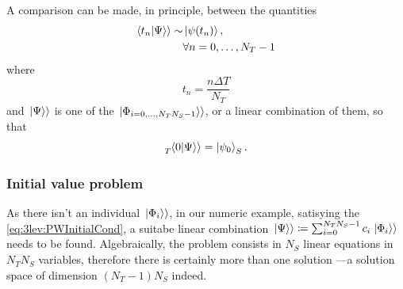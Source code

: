A comparison can be made, in principle, between the quantities
\begin{align}\begin{split}\label{eq:3lev:PWComparison}
  \!\left.\left\langle t_n \middle| \Psi \right\rangle\right\rangle \sim  &\ket{\psi(t_n)},\\
                            &\forall n = 0, \dots, N_{T}-1
\end{split}\end{align}
where \[ t_{n} = \frac{n\Delta T}{N_T} \]
and
$\left.\left| \Psi \right\rangle\right\rangle$ is one of the ${\left.\left| \Phi_{i=0,\dots,N_T N_S - 1} \right\rangle\right\rangle}$,
or a linear combination of them,
so that
\begin{equation}\label{eq:3lev:PWInitialCond}
  \prescript{}{T}{\!\left.\left\langle 0 \middle| \Psi \right\rangle\right\rangle} = \ket{\psi_0}_S \text{.}
\end{equation}

\subsubsection*{Initial value problem}

As there isn't an individual $\left.\left| \Phi_i \right\rangle\right\rangle$,
in our numeric example,
satisying the \eqref{eq:3lev:PWInitialCond},
a suitabe linear combination
$\left.\left| \Psi \right\rangle\right\rangle \coloneqq \sum_{i=0}^{N_{T}N_{S}-1} c_{i}\left.\left| \Phi_i \right\rangle\right\rangle$
needs to be found. Algebraically, the problem consists in
$N_{S}$ linear equations
in $N_{T}N_{S}$ variables, therefore there is certainly more than one solution
---a solution space of dimension $(N_{T} - 1)N_{S}$ indeed.

